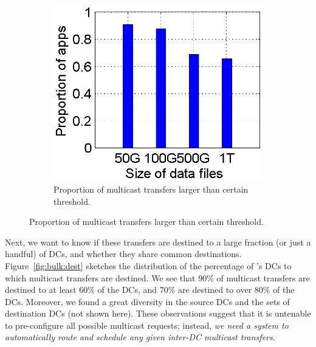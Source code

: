 \begin{figure}[t]
\begin{subfigure}[b]{0.23\textwidth}
                \includegraphics[width=\textwidth]{images/DataSize_v2.eps}
                \caption{Proportion of multicast transfers larger than certain threshold.}
                \label{fig:bulk:size}
        \end{subfigure}
        \vspace{-0.4cm}
        \label{fig:bulk}
\vspace{-0.4cm}
\end{figure}

Next, we want to know if these transfers are destined to a large
fraction (or just a handful) of DCs, and whether they share common
destinations. Figure~\ref{fig:bulk:dest} sketches the distribution
of the percentage of \company's DCs to which multicast transfers
are destined. We see that 90\% of multicast transfers are destined to
at least 60\% of the DCs, and 70\% are destined to over 80\% of the DCs. Moreover,
we found a great diversity in the source DCs and the sets of destination
DCs (not shown here). These observations suggest that it is untenable
to pre-configure all possible multicast requests; instead, {\em we
need a system to automatically route and schedule any given inter-DC
multicast transfers.}

